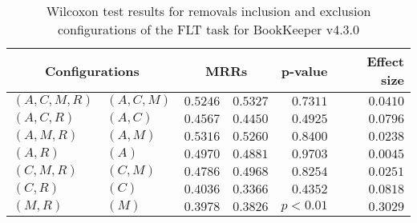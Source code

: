 
\begin{table}
\begin{spacing}{1.2}
\centering
\caption{Wilcoxon test results for removals inclusion and exclusion configurations of the FLT task for BookKeeper v4.3.0}
\label{table:versus-wilcox-bookkeeper-flt-removals}
\begin{tabular}{ll|rr|rr}
\toprule
      \multicolumn{2}{c|}{Configurations} &          \multicolumn{2}{c|}{MRRs} &       p-value & Effect size \\
\midrule
 $(A,C,M,R)$ &  $(A,C,M)$ & $0.5246$ & $0.5327$ & $0.7311$ &    $0.0410$ \\
   $(A,C,R)$ &    $(A,C)$ & $0.4567$ & $0.4450$ & $0.4925$ &    $0.0796$ \\
   $(A,M,R)$ &    $(A,M)$ & $0.5316$ & $0.5260$ & $0.8400$ &    $0.0238$ \\
     $(A,R)$ &      $(A)$ & $0.4970$ & $0.4881$ & $0.9703$ &    $0.0045$ \\
   $(C,M,R)$ &    $(C,M)$ & $0.4786$ & $0.4968$ & $0.8254$ &    $0.0251$ \\
     $(C,R)$ &      $(C)$ & $0.4036$ & $0.3366$ & $0.4352$ &    $0.0818$ \\
     $(M,R)$ &      $(M)$ & $0.3978$ & $0.3826$ & $p<0.01$ &    $0.3029$ \\
\bottomrule
\end{tabular}

\end{spacing}
\end{table}

